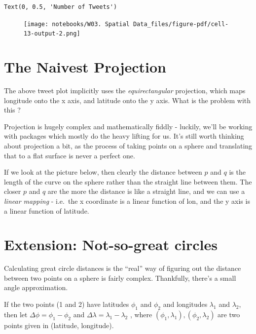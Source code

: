 \documentclass[
  letterpaper,
  DIV=11,
  numbers=noendperiod]{scrreprt}
\begin{document}
\begin{verbatim}
Text(0, 0.5, 'Number of Tweets')
\end{verbatim}

\begin{figure}[H]

{\centering \texttt{[image: notebooks/W03. Spatial Data\_files/figure-pdf/cell-13-output-2.png]}

}

\end{figure}

\hypertarget{the-naivest-projection}{%
\section{The Naivest Projection}\label{the-naivest-projection}}

The above tweet plot implicitly uses the \emph{equirectangular}
projection, which maps longitude onto the x axis, and latitude onto the
y axis. What is the problem with this ?

Projection is hugely complex and mathematically fiddly - luckily, we'll
be working with packages which mostly do the heavy lifting for us. It's
still worth thinking about projection a bit, as the process of taking
points on a sphere and translating that to a flat surface is never a
perfect one.

If we look at the picture below, then clearly the distance between \(p\)
and \(q\) is the length of the curve on the sphere rather than the
straight line between them. The closer \(p\) and \(q\) are the more the
distance is like a straight line, and we can use a \emph{linear mapping}
- i.e.~the x coordinate is a linear function of lon, and the y axis is a
linear function of latitude.

\hypertarget{extension-not-so-great-circles}{%
\section{Extension: Not-so-great
circles}\label{extension-not-so-great-circles}}

Calculating great circle distances is the ``real'' way of figuring out
the distance between two points on a sphere is fairly complex.
Thankfully, there's a small angle approximation.

If the two points (1 and 2) have latitudes \(\phi_1\) and \(\phi_2\) and
longitudes \(\lambda_1\) and \(\lambda_2\), then let
\(\Delta\phi = \phi_1 - \phi_2\) and
\(\Delta\lambda = \lambda_1 - \lambda_2\) , where
\((\phi_1,\lambda_1) ,(\phi_2,\lambda_2)\) are two points given in
(latitude, longitude).
\end{document}
